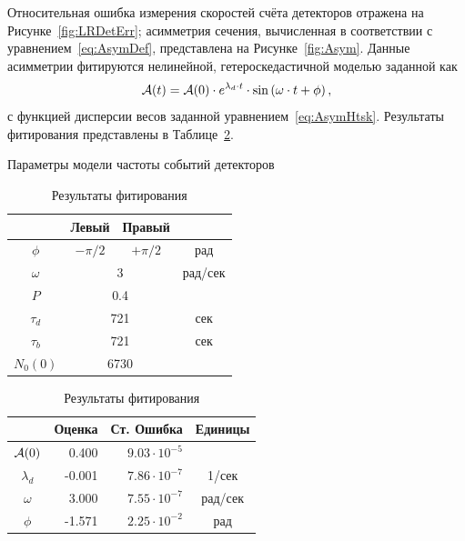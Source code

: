 \documentclass{report}
\newcommand{\vp}[2]{{#1}\cdot 10^{#2}}
\newcommand{\LTb}{\tau_b}
\newcommand{\LTd}{\tau_d}
\newcommand{\lamd}{\lambda_d}
\begin{document}
Относительная ошибка измерения скоростей счёта детекторов отражена на
Рисунке~\ref{fig:LRDetErr}; асимметрия сечения, вычисленная в
соответствии с уравнением~\eqref{eq:AsymDef}, представлена на Рисунке~\ref{fig:Asym}.
Данные асимметрии фитируются нелинейной, гетероскедастичной моделью
заданной как
\[
\Asym(t) = \Asym(0)\cdot e^{\lamd\cdot t}\cdot\sin\bkt{\omega\cdot t + \phi},
\]
с функцией дисперсии весов заданной
уравнением~\eqref{eq:AsymHtsk}. Результаты фитирования представлены в Таблице~\ref{tbl:FitRes}.
\begin{table}[h]
  \begin{minipage}[t]{.5\linewidth}
    \centering
    \caption{Параметры модели частоты событий детекторов\label{tbl:DetCntRtParam}}
    \begin{tabular}[t]{cccc}
      \hline
      &   Левый   &     Правый     &  \\ \hline
      $\phi$  & $-\pi/2$ &   $+\pi/2$    &   рад   \\
      $\omega$ &  \multicolumn{2}{c}{3}   & рад/сек \\
      $P$    & \multicolumn{2}{c}{0.4}  &  \\
      $\LTd$  & \multicolumn{2}{c}{721}  &   сек   \\
      $\LTb$  & \multicolumn{2}{c}{721}  &   сек   \\
      $N_0(0)$ & \multicolumn{2}{c}{6730} &  \\ \hline
    \end{tabular}
  \end{minipage}%
  \begin{minipage}[t]{.5\linewidth}
    \centering
    \caption{Результаты фитирования\label{tbl:FitRes}}
    \begin{tabular}[t]{crrc}
      \hline
      & Оценка &             Ст. Ошибка &  Единицы   \\ \hline
      $\mathcal{A}(0)$ &   0.400 & $\vp{9.03}{-5}$ &         \\
      $\lamd$   &  -0.001 & $\vp{7.86}{-7}$ &  1/сек  \\
      $\omega$  &   3.000 & $\vp{7.55}{-7}$ & рад/сек \\
      $\phi$   &  -1.571 & $\vp{2.25}{-2}$ &   рад   \\ \hline
    \end{tabular}
  \end{minipage}
\end{table}
\end{document}
